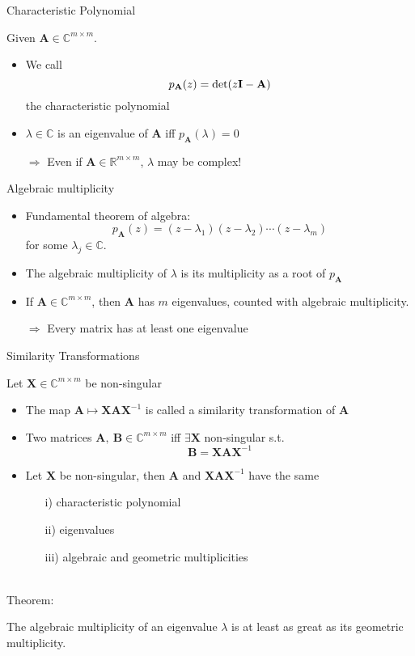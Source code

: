 \documentclass{beamer}
\newcommand{\bvec}[1]{\mathbf{#1}}
\newcommand{\vA}{\bvec{A}}
\newcommand{\vB}{\bvec{B}}
\newcommand{\vI}{\bvec{I}}
\newcommand{\vX}{\bvec{X}}
\newcommand{\bitem}{\item[$\bullet$]}
\begin{document}
\begin{frame}{Characteristic Polynomial}

Given $\vA\in\mathbb{C}^{m\times m}$.
\begin{itemize}
    \bitem We call
    $$
    p_{\vA}(z)
    =
    {\rm det}(z\vI - \vA)
    $$
    the characteristic polynomial
    \bitem $\lambda\in\mathbb{C}$ is an eigenvalue of $\vA$ iff $p_{\vA}(\lambda) = 0$\\
    \begin{center}
        $\Rightarrow$ Even if $\vA \in\mathbb{R}^{m\times m}$, $\lambda$ may be complex!
    \end{center}
    
\end{itemize}
    
\end{frame}

\begin{frame}{Algebraic multiplicity}


\begin{itemize}
    \bitem Fundamental theorem of algebra:\\
$$
p_{\vA}(z)
=
(z- \lambda_1)(z- \lambda_2)\cdots (z- \lambda_m)
$$
for some $\lambda_j \in \mathbb{C}$.
\bitem The algebraic multiplicity of $\lambda$ is its multiplicity as a root of $p_{\vA}$ 
\bitem If $\vA \in \mathbb{C}^{m\times m}$, then $\vA$ has $m$ eigenvalues, counted with algebraic multiplicity.
\begin{center}
$\Rightarrow$ Every matrix has at least one eigenvalue
\end{center}
\end{itemize}
\end{frame}

\begin{frame}{Similarity Transformations}

Let $\vX \in \mathbb{C}^{m \times m}$ be non-singular
\begin{itemize}
    \bitem The map $\vA \mapsto \vX \vA \vX^{-1}$ is called a similarity transformation of $\vA$ 
    \bitem Two matrices $\vA,~\vB\in\mathbb{C}^{m \times m}$ iff $\exists \vX$ non-singular s.t.
    $$
    \vB = \vX \vA \vX^{-1} 
    $$
    \bitem Let $\vX$ be non-singular, then $\vA$ and $\vX \vA \vX^{-1}$ have the same 
    \begin{itemize}
        \item[i)] characteristic polynomial
        \item[ii)] eigenvalues
        \item[iii)] algebraic and geometric multiplicities
    \end{itemize}
\end{itemize}
~\\
Theorem:\vspace{-2mm}
\begin{center}
The algebraic multiplicity of an eigenvalue $\lambda$ is at least as great as its geometric multiplicity.
\end{center}

\end{frame}
\end{document}
